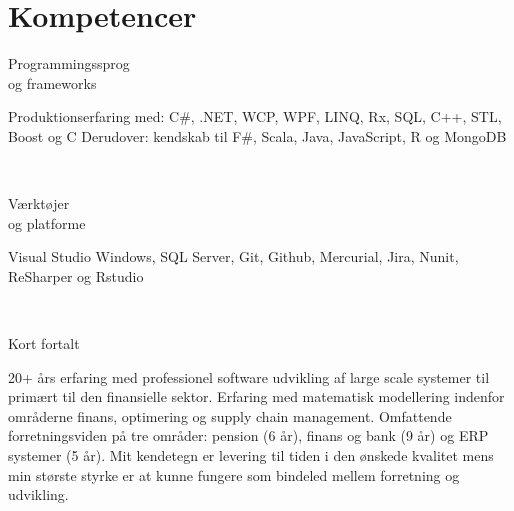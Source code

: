 \documentclass[10pt, a4paper]{article}
\begin{document}
\section{Kompetencer}
\begin{Row}%
  \begin{Cell}{1}
    Programmingssprog \\[1ex]
    og frameworks
  \end{Cell}
  \begin{Cell}{3}
    Produktionserfaring med: C\#, .NET, WCP, WPF, LINQ, Rx, SQL, C++, STL, Boost og C Derudover: kendskab til F\#, Scala, Java, JavaScript, R og MongoDB
  \end{Cell}
\end{Row}
\\[0.5cm]
\begin{Row}%
  \begin{Cell}{1}
    Værktøjer \\[1ex]
    og platforme
  \end{Cell}
  \begin{Cell}{3}
    Visual Studio Windows, SQL Server, Git, Github, Mercurial, Jira, Nunit, ReSharper og Rstudio
  \end{Cell}
\end{Row}
\\[0.5cm]
\begin{Row}%
  \begin{Cell}{1}
    Kort fortalt
  \end{Cell}
  \begin{Cell}{3}
    20+ års erfaring med professionel software udvikling af large scale systemer til primært til den finansielle sektor. Erfaring med matematisk modellering indenfor områderne finans, optimering og supply chain management. Omfattende forretningsviden på tre områder: pension (6 år), finans og bank (9 år) og ERP systemer (5 år). Mit kendetegn er levering til tiden i den ønskede kvalitet mens min største styrke er at kunne fungere som bindeled mellem forretning og udvikling.
  \end{Cell}
\end{Row}

\end{document}

